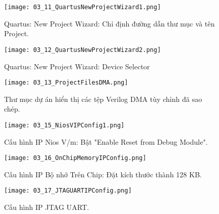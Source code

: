 \begin{figure}[htbp] \centering \texttt{[image: 03\_11\_QuartusNewProjectWizard1.png]} \caption{Quartus: New Project Wizard: Chỉ định đường dẫn thư mục và tên Project.} \label{fig:03_11} \end{figure}
\begin{figure}[htbp] \centering \texttt{[image: 03\_12\_QuartusNewProjectWizard2.png]} \caption{Quartus: New Project Wizard: Device Selector} \label{fig:03_12} \end{figure}
\begin{figure}[htbp] \centering \texttt{[image: 03\_13\_ProjectFilesDMA.png]} \caption{Thư mục dự án hiển thị các tệp Verilog DMA tùy chỉnh đã sao chép.} \label{fig:03_13} \end{figure}
\begin{figure}[htbp] \centering \texttt{[image: 03\_15\_NiosVIPConfig1.png]} \caption{Cấu hình IP Nios V/m: Bật "Enable Reset from Debug Module".} \label{fig:03_15} \end{figure}
\begin{figure}[htbp] \centering \texttt{[image: 03\_16\_OnChipMemoryIPConfig.png]} \caption{Cấu hình IP Bộ nhớ Trên Chip: Đặt kích thước thành 128 KB.} \label{fig:03_16} \end{figure}
\begin{figure}[htbp] \centering \texttt{[image: 03\_17\_JTAGUARTIPConfig.png]} \caption{Cấu hình IP JTAG UART.} \label{fig:03_17} \end{figure}
